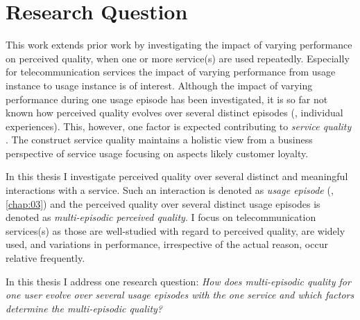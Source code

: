 \section{Research Question}
This work extends prior work by investigating the impact of varying performance on perceived quality, when one or more service(s) are used repeatedly.
Especially for telecommunication services the impact of varying performance from usage instance to usage instance is of interest.
Although the impact of varying performance during one usage episode has been investigated, it is so far not known how perceived quality evolves over several distinct episodes (\ie, individual experiences).
This, however, one factor is expected contributing to \emph{service quality} \citep[\cf,][]{zeithaml_behavioral_1996}.
The construct service quality maintains a holistic view from a business perspective of service usage focusing on aspects likely customer loyalty. %

In this thesis I investigate perceived quality over several distinct and meaningful interactions with a service.
Such an interaction is denoted as \emph{usage episode} (\cf, \autoref{chap:03}) and the perceived quality over several distinct usage episodes is denoted as \emph{multi-episodic perceived quality}.
I focus on telecommunication services(s) as those are well-studied with regard to perceived quality, are widely used, and variations in performance, irrespective of the actual reason, occur relative frequently.

In this thesis I address one research question: 
\emph{How does multi-episodic quality for one user evolve over several usage episodes with the one service and which factors determine the multi-episodic quality?}


